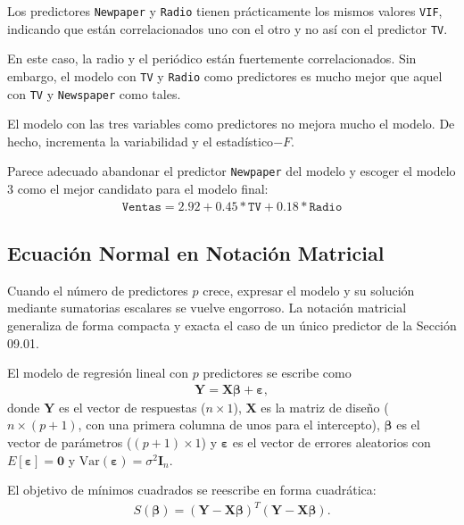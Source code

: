Los predictores \texttt{Newpaper} y \texttt{Radio} tienen prácticamente los mismos valores \texttt{VIF}, indicando que están correlacionados uno con el otro y no así con el predictor \texttt{TV}.


En este caso, la radio y el periódico están fuertemente correlacionados. Sin embargo, el modelo con \texttt{TV} y \texttt{Radio} como predictores es mucho mejor que aquel con \texttt{TV} y \texttt{Newspaper} como tales.


El modelo con las tres variables como predictores no mejora mucho el modelo. De hecho, incrementa la variabilidad y el estadístico$-F.$


Parece adecuado abandonar el predictor \texttt{Newpaper} del modelo y escoger el modelo 3 como el mejor candidato para el modelo final:
\begin{align}
	\texttt{Ventas} = 2.92 + 0.45*\texttt{TV} + 0.18*\texttt{Radio}
\end{align}

\subsection{Ecuación Normal en Notación Matricial}

Cuando el número de predictores $p$ crece, expresar el modelo y su solución mediante sumatorias escalares se vuelve engorroso. La notación matricial generaliza de forma compacta y exacta el caso de un único predictor de la Sección 09.01.

\begin{definicion}
	El modelo de regresión lineal con $p$ predictores se escribe como
	\begin{align}
		\mathbf{Y} = \mathbf{X}\boldsymbol{\beta} + \boldsymbol{\varepsilon},
	\end{align}
	donde $\mathbf{Y}$ es el vector de respuestas ($n\times1$), $\mathbf{X}$ es la matriz de diseño ($n\times(p+1)$, con una primera columna de unos para el intercepto), $\boldsymbol{\beta}$ es el vector de parámetros ($(p+1)\times1$) y $\boldsymbol{\varepsilon}$ es el vector de errores aleatorios con $E[\boldsymbol{\varepsilon}]=\mathbf{0}$ y $\text{Var}(\boldsymbol{\varepsilon})=\sigma^2\mathbf{I}_n$.
\end{definicion}

El objetivo de mínimos cuadrados se reescribe en forma cuadrática:
\begin{align}
	S(\boldsymbol{\beta}) = (\mathbf{Y}-\mathbf{X}\boldsymbol{\beta})^T(\mathbf{Y}-\mathbf{X}\boldsymbol{\beta}).
\end{align}

